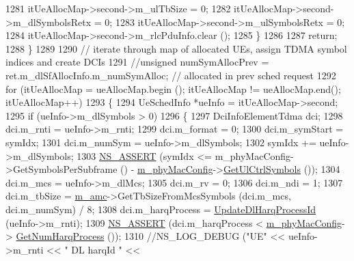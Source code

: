 \begin{DoxyCode}
1281                         itUeAllocMap->second->m\_ulTbSize = 0;
1282                         itUeAllocMap->second->m\_dlSymbolsRetx = 0;
1283                         itUeAllocMap->second->m\_ulSymbolsRetx = 0;
1284                         itUeAllocMap->second->m\_rlcPduInfo.clear ();
1285                 \}
1286 
1287                 \textcolor{keywordflow}{return};
1288         \}
1289 
1290         \textcolor{comment}{// iterate through map of allocated UEs, assign TDMA symbol indices and create DCIs}
1291         \textcolor{comment}{//unsigned numSymAllocPrev = ret.m\_dlSfAllocInfo.m\_numSymAlloc; // allocated in prev sched request}
1292         \textcolor{keywordflow}{for} (itUeAllocMap = ueAllocMap.begin (); itUeAllocMap != ueAllocMap.end(); itUeAllocMap++)
1293         \{
1294                 UeSchedInfo *ueInfo = itUeAllocMap->second;
1295                 \textcolor{keywordflow}{if} (ueInfo->m\_dlSymbols > 0)
1296                 \{
1297                         DciInfoElementTdma dci;
1298                         dci.m\_rnti = ueInfo->m\_rnti;
1299                         dci.m\_format = 0;
1300                         dci.m\_symStart = symIdx;
1301                         dci.m\_numSym = ueInfo->m\_dlSymbols;
1302                         symIdx += ueInfo->m\_dlSymbols;
1303                         \hyperlink{assert_8h_a6dccdb0de9b252f60088ce281c49d052}{NS\_ASSERT} (symIdx <= m\_phyMacConfig->GetSymbolsPerSubframe () - 
      \hyperlink{classns3_1_1MmWaveMacScheduler_a24d7af4971d2e500fe543cefbafa2fd9}{m\_phyMacConfig}->\hyperlink{classns3_1_1MmWavePhyMacCommon_aa0bf8af14050bc5dc6513fbc86319a9b}{GetUlCtrlSymbols} ());
1304                         dci.m\_mcs = ueInfo->m\_dlMcs;
1305                         dci.m\_rv = 0;
1306                         dci.m\_ndi = 1;
1307                         dci.m\_tbSize = \hyperlink{classns3_1_1MmWaveFlexTtiMaxWeightMacScheduler_a36c22ad89fe5d6743a058f253a43a70d}{m\_amc}->GetTbSizeFromMcsSymbols (dci.m\_mcs, dci.m\_numSym) / 8;
1308                         dci.m\_harqProcess = \hyperlink{classns3_1_1MmWaveFlexTtiMaxWeightMacScheduler_a73611c8eb3143575a9a70ec64ad162b2}{UpdateDlHarqProcessId} (ueInfo->m\_rnti);
1309                         \hyperlink{assert_8h_a6dccdb0de9b252f60088ce281c49d052}{NS\_ASSERT} (dci.m\_harqProcess < \hyperlink{classns3_1_1MmWaveMacScheduler_a24d7af4971d2e500fe543cefbafa2fd9}{m\_phyMacConfig}->
      \hyperlink{classns3_1_1MmWavePhyMacCommon_a40773d84172ebeb5aff125f56ebcc5ac}{GetNumHarqProcess} ());
1310                         \textcolor{comment}{//NS\_LOG\_DEBUG ("UE" << ueInfo->m\_rnti << " DL harqId " <<
}
\end{DoxyCode}
